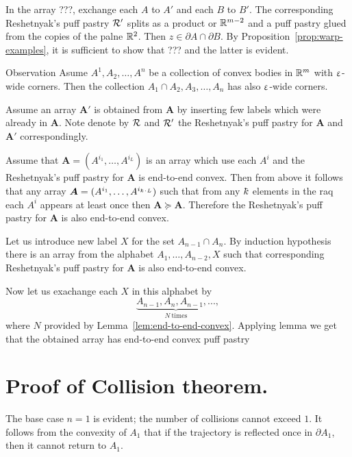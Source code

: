 In the array ???, 
exchange each $A$ to $A'$ and each $B$ to $B'$.
The corresponding Reshetnyak's puff pastry $\mathcal{R}'$
splits as a product or $\mathbb{R}^{m-2}$ and a puff pastry
glued from the copies of the palne $\mathbb{R}^2$.
Then $z\in\partial A\cap\partial B$.
By Proposition~\ref{prop:warp-examples},
it is sufficient to show that ???
and the latter is evident.
\qeds
 

\begin{thm}{Observation}
Asume $A^1,A_2,\dots,A^n$ be a collection of convex bodies in $\mathbb{R}^m$
with $\upvarepsilon$-wide corners.
Then the collection 
$A_1\cap A_2,A_3,\dots,A_n$ has also $\upvarepsilon$-wide corners.
\end{thm}

\qeds


Assume an array $\bm{A}'$ is obtained from $\bm{A}$ by inserting few labels which were already in $\bm{A}$.
Note denote by $\mathcal{R}$ and $\mathcal{R}'$
the  Reshetnyak's puff pastry for $\bm{A}$ and $\bm{A}'$ correspondingly.

Assume that 
$\bm{A}=(A^{i_1},\dots,A^{i_L})$ is an array which use each $A^i$
and the Reshetnyak's puff pastry for $\bm{A}$ is end-to-end convex.
Then from above it follows that any array
$\bm{A}=(A^{i_1},\dots,A^{i_{\kay\cdot L}})$
such that from any $\kay$ elements in the raq each $A^i$ appears at least once then 
$\bm{A}\succeq\bm{A}$.
Therefore the Reshetnyak's puff pastry for $\bm{A}$ is also end-to-end convex.

Let us introduce new label $X$ for the set $A_{n-1}\cap A_n$.
By induction hypothesis there is an array
from the alphabet $A_1,\dots,A_{n-2},X$ such that corresponding 
Reshetnyak's puff pastry for $\bm{A}$ is also end-to-end convex.

Now let us exachange each $X$ in this alphabet by 
\[\underbrace{A_{n-1},A_n,A_{n-1},...}_{N\ \text{times}},\]
where $N$ provided by Lemma~\ref{lem:end-to-end-convex}.
Applying lemma we get that the obtained array has end-to-end convex puff pastry
\qeds



\section{Proof of Collision theorem.}


The base case $n=1$ is evident; the number of collisions cannot exceed $1$.  
It follows from the convexity of $A_1$ that
if the trajectory is reflected once in $\partial A_1$, 
then it cannot return to $A_1$.

